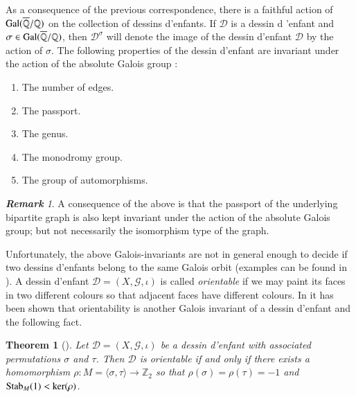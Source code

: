 \documentclass[12pt]{amsart}
\newtheorem{theo}{Theorem}
\theoremstyle{remark}
\newtheorem{rema}{\bf Remark}
\begin{document}
As a consequence of the previous correspondence, there is a faithful action of ${\rm Gal}(\overline{\mathbb Q}/{\mathbb Q})$ on the collection of dessins d'enfants.
If ${\mathcal D}$ is a dessin d 'enfant and $\sigma \in {\rm Gal}(\overline{\mathbb Q}/{\mathbb Q})$, then ${\mathcal D}^{\sigma}$ will denote the image of the dessin d'enfant ${\mathcal D}$ by the action of $\sigma$. The following properties of the dessin d'enfant are invariant under the action of the absolute Galois group \cite{GiGo}:
\begin{enumerate} 
\item The number of edges.
\item The passport.
\item The genus.
\item The monodromy group.
\item The group of automorphisms. 
\end{enumerate}

{\vspace{0.3cm}}
\noindent
\begin{rema}
A consequence of the above is that the passport of the  underlying bipartite graph is also kept invariant under the action of the absolute Galois group; but not necessarily the isomorphism type of the graph.
\end{rema}

{\vspace{0.3cm}}

Unfortunately, the above Galois-invariants are not in general enough to decide if two dessins d'enfants belong to the same Galois orbit (examples can be found in \cite{GiGo}). A dessin d'enfant ${\mathcal D}=(X,{\mathcal G},\iota)$ is called {\it orientable} if we may paint its faces in two different colours so that adjacent faces have different colours. In \cite{GGH} it has been shown that orientability is another Galois invariant of a dessin d'enfant and the following fact.

{\vspace{0.3cm}}
\noindent
\begin{theo}[\cite{GGH}]
Let ${\mathcal D}=(X,{\mathcal G},\iota)$ be a dessin d'enfant with associated permutations $\sigma$ and $\tau$. Then ${\mathcal D}$ is orientable if and only if 
there exists a homomorphism $\rho:M=\langle \sigma,\tau\rangle \to {\mathbb Z}_{2}$ so that $\rho(\sigma)=\rho(\tau)=-1$ and ${\rm Stab}_{M}(1)<\ker(\rho)$.
\end{theo}

{\vspace{0.3cm}}
\end{document}
